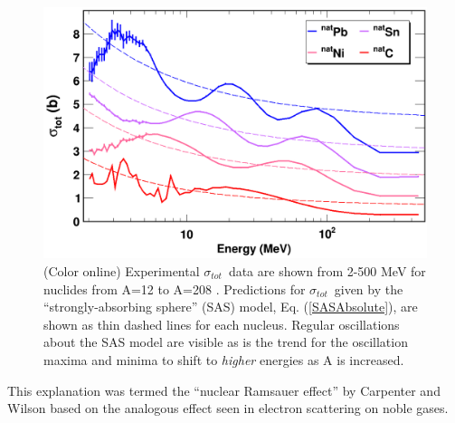 \documentclass[twocolumn,secnumarabic,amssymb, nobibnotes, aps, prl,
superscriptaddress, nobalancelastpage, draft]{revtex4}
\newcommand{\tot}{\ensuremath{\sigma_{tot}}}
\begin{document}
\begin{figure}
    \includegraphics[width=\linewidth]{figures/ExampleTCS.png}
    \caption{
        (Color online) Experimental \tot\ data are shown from 2-500
        MeV for nuclides from A=12 to A=208
        \protect\cite{Finlay1993, Schwartz1974, Poenitz1983, Abfalterer2000, Abfalterer2001}.
        Predictions for \tot\ given by the ``strongly-absorbing sphere'' (SAS)
        model, Eq. (\ref{SASAbsolute}), are shown as thin dashed lines for each nucleus.
        Regular oscillations about the SAS model are visible
        as is the trend for the oscillation
        maxima and minima to shift to \textit{higher} energies as A is increased.
    }
    \label{SASphereVsExperiment}
\end{figure}
This explanation was termed the 
``nuclear Ramsauer effect'' by Carpenter and Wilson \cite{Carpenter1959} based on 
the analogous effect seen in electron scattering on noble gases.
\end{document}
